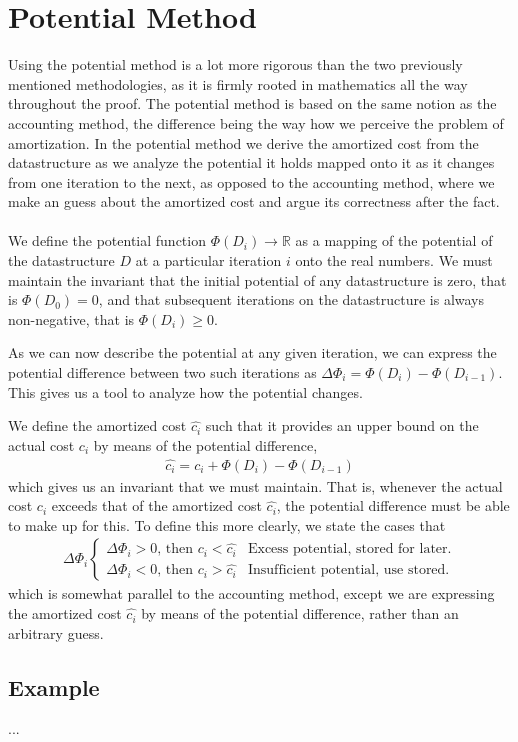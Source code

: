 \section{Potential Method}
Using the potential method is a lot more rigorous than the two previously
mentioned methodologies, as it is firmly rooted in mathematics all the way
throughout the proof. The potential method is based on the same notion as the
accounting method, the difference being the way how we perceive the problem of
amortization. In the potential method we derive the amortized cost from the
datastructure as we analyze the potential it holds mapped onto it as it
changes from one iteration to the next, as opposed to the accounting method,
where we make an guess about the amortized cost and argue its correctness
after the fact.
\\\\
We define the potential function $\Phi(D_i) \rightarrow \mathbb{R}$ as a
mapping of the potential of the datastructure $D$ at a particular iteration
$i$ onto the real numbers. We must maintain the invariant that the initial
potential of any datastructure is zero, that is $\Phi(D_0) = 0$, and that
subsequent iterations on the datastructure is always non-negative, that is
$\Phi(D_i) \geq 0$.

As we can now describe the potential at any given iteration, we can express
the potential difference between two such iterations as $\Delta\Phi_i =
\Phi(D_i) - \Phi(D_{i-1})$. This gives us a tool to analyze how the
potential changes.

We define the amortized cost $\hat{c_i}$ such that it provides an upper bound
on the actual cost $c_i$ by means of the potential difference,
\begin{align}
	\hat{c_i} = c_i + \Phi(D_i) - \Phi(D_{i-1})
\end{align}
which gives us an invariant that we must maintain. That is, whenever the
actual cost $c_i$ exceeds that of the amortized cost $\hat{c_i}$, the
potential difference must be able to make up for this. To define this more
clearly, we state the cases that
\begin{align}
	\Delta\Phi_i
	\begin{cases}
		\Delta\Phi_i > 0 \text{, then }c_i < \hat{c_i} &
		\text{Excess potential, stored for later.} \\
		\Delta\Phi_i < 0 \text{, then }c_i > \hat{c_i} &
		\text{Insufficient potential, use stored.}
	\end{cases}	
\end{align}
which is somewhat parallel to the accounting method, except we are expressing
the amortized cost $\hat{c_i}$ by means of the potential difference, rather
than an arbitrary guess.

\subsection{Example}
...


